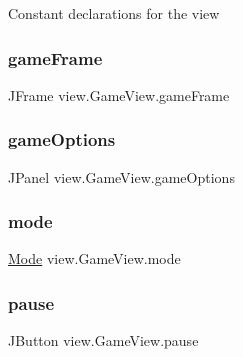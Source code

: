 Constant declarations for the view \hypertarget{classview_1_1_game_view_a7e90e32a71e4cbc5356dd2960290917c}{}\label{classview_1_1_game_view_a7e90e32a71e4cbc5356dd2960290917c} 
\subsubsection{\texorpdfstring{game\+Frame}{gameFrame}}
{\footnotesize\ttfamily J\+Frame view.\+Game\+View.\+game\+Frame\hspace{0.3cm}{\ttfamily [private]}}

\hypertarget{classview_1_1_game_view_aba201c4e7e254be3254ddffba23f563e}{}\label{classview_1_1_game_view_aba201c4e7e254be3254ddffba23f563e} 
\subsubsection{\texorpdfstring{game\+Options}{gameOptions}}
{\footnotesize\ttfamily J\+Panel view.\+Game\+View.\+game\+Options\hspace{0.3cm}{\ttfamily [private]}}

\hypertarget{classview_1_1_game_view_a805dd6b76de78fe934f8c4287b4988ce}{}\label{classview_1_1_game_view_a805dd6b76de78fe934f8c4287b4988ce} 
\subsubsection{\texorpdfstring{mode}{mode}}
{\footnotesize\ttfamily \hyperlink{classview_1_1_mode}{Mode} view.\+Game\+View.\+mode\hspace{0.3cm}{\ttfamily [private]}}

\hypertarget{classview_1_1_game_view_aca05d6a7d46254d509c48b09945b7053}{}\label{classview_1_1_game_view_aca05d6a7d46254d509c48b09945b7053} 
\subsubsection{\texorpdfstring{pause}{pause}}
{\footnotesize\ttfamily J\+Button view.\+Game\+View.\+pause\hspace{0.3cm}{\ttfamily [private]}}

